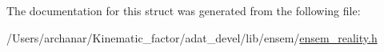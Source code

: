 The documentation for this struct was generated from the following file\+:\begin{DoxyCompactItemize}
\item 
/\+Users/archanar/\+Kinematic\+\_\+factor/adat\+\_\+devel/lib/ensem/\mbox{\hyperlink{lib_2ensem_2ensem__reality_8h}{ensem\+\_\+reality.\+h}}\end{DoxyCompactItemize}
